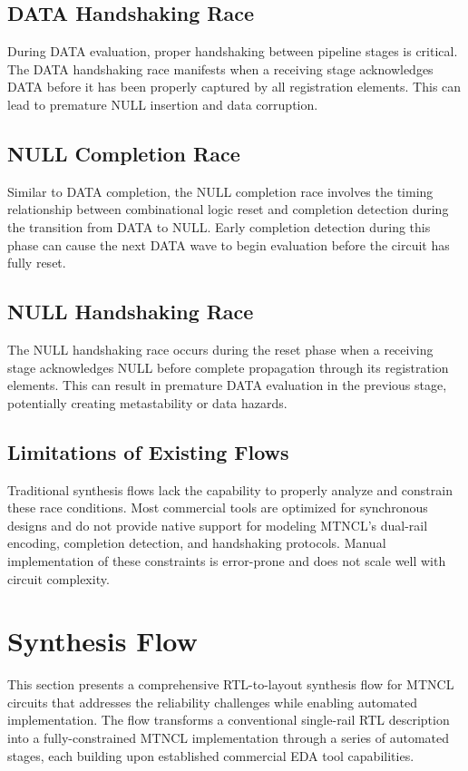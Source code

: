 \documentclass[conference]{IEEEtran}
\begin{document}
\subsection{DATA Handshaking Race} 
During DATA evaluation, proper handshaking between pipeline stages is critical. The DATA handshaking race manifests when a receiving stage acknowledges DATA before it has been properly captured by all registration elements. This can lead to premature NULL insertion and data corruption.

\subsection{NULL Completion Race}
Similar to DATA completion, the NULL completion race involves the timing relationship between combinational logic reset and completion detection during the transition from DATA to NULL. Early completion detection during this phase can cause the next DATA wave to begin evaluation before the circuit has fully reset.

\subsection{NULL Handshaking Race}
The NULL handshaking race occurs during the reset phase when a receiving stage acknowledges NULL before complete propagation through its registration elements. This can result in premature DATA evaluation in the previous stage, potentially creating metastability or data hazards.

\subsection{Limitations of Existing Flows}
Traditional synthesis flows lack the capability to properly analyze and constrain these race conditions. Most commercial tools are optimized for synchronous designs and do not provide native support for modeling MTNCL's dual-rail encoding, completion detection, and handshaking protocols. Manual implementation of these constraints is error-prone and does not scale well with circuit complexity.

\section{Synthesis Flow}
This section presents a comprehensive RTL-to-layout synthesis flow for MTNCL circuits that addresses the reliability challenges while enabling automated implementation. The flow transforms a conventional single-rail RTL description into a fully-constrained MTNCL implementation through a series of automated stages, each building upon established commercial EDA tool capabilities.
\end{document}
